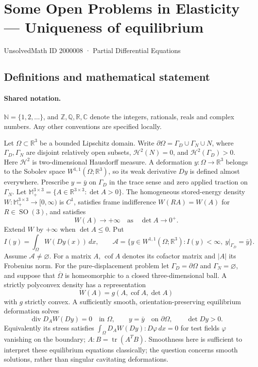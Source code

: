 \documentclass[11pt]{book}
\begin{document}
\setcounter{section}{2000007}
\section{Some Open Problems in Elasticity — Uniqueness of equilibrium}\label{2000008}
{\small\sffamily UnsolvedMath ID 2000008 · Partial Differential Equations}
\subsection{Definitions and mathematical statement}

\paragraph{Shared notation.}$\mathbb N=\{1,2,\ldots\}$, and $\mathbb Z,\mathbb Q,\mathbb R,\mathbb C$ denote the integers, rationals, reals and complex numbers. Any other conventions are specified locally.


Let $\Omega\subset\mathbb R^3$ be a bounded Lipschitz domain. Write $\partial\Omega=\Gamma_D\cup\Gamma_N\cup N$, where $\Gamma_D,\Gamma_N$ are disjoint relatively open subsets, $\mathcal H^2(N)=0$, and $\mathcal H^2(\Gamma_D)>0$. Here $\mathcal H^2$ is two-dimensional Hausdorff measure. A deformation $y:\Omega\to\mathbb R^3$ belongs to the Sobolev space $W^{1,1}(\Omega;\mathbb R^3)$, so its weak derivative $Dy$ is defined almost everywhere. Prescribe $y=\bar y$ on $\Gamma_D$ in the trace sense and zero applied traction on $\Gamma_N$.
Let $\mathbb M_+^{3\times3}=\{A\in\mathbb R^{3\times3}:\det A>0\}$. The homogeneous stored-energy density $W:\mathbb M_+^{3\times3}\to[0,\infty)$ is $C^1$, satisfies frame indifference $W(RA)=W(A)$ for $R\in\operatorname{SO}(3)$, and satisfies
\[
 W(A)\longrightarrow+\infty\quad\text{as}\quad\det A\longrightarrow0^+.
\]
Extend $W$ by $+\infty$ when $\det A\le0$. Put
\[
 I(y)=\int_\Omega W(Dy(x))\,dx,\qquad
 \mathcal A=\{y\in W^{1,1}(\Omega;\mathbb R^3):I(y)<\infty,\ y|_{\Gamma_D}=\bar y\}.
\]
Assume $\mathcal A\ne\varnothing$. For a matrix $A$, $\operatorname{cof}A$ denotes its cofactor matrix and $|A|$ its Frobenius norm.
For the pure-displacement problem let $\Gamma_D=\partial\Omega$ and $\Gamma_N=\varnothing$, and suppose that $\overline\Omega$ is homeomorphic to a closed three-dimensional ball. A strictly polyconvex density has a representation
\[W(A)=g(A,\operatorname{cof}A,\det A)\]
with $g$ strictly convex. A sufficiently smooth, orientation-preserving equilibrium deformation solves
\[
 \operatorname{div}D_AW(Dy)=0\quad\text{in }\Omega,
 \qquad y=\bar y\quad\text{on }\partial\Omega,
 \qquad\det Dy>0.
\]
Equivalently its stress satisfies $\int_\Omega D_AW(Dy):D\varphi\,dx=0$ for test fields $\varphi$ vanishing on the boundary; $A:B=\operatorname{tr}(A^TB)$. Smoothness here is sufficient to interpret these equilibrium equations classically; the question concerns smooth solutions, rather than singular cavitating deformations.
\end{document}
